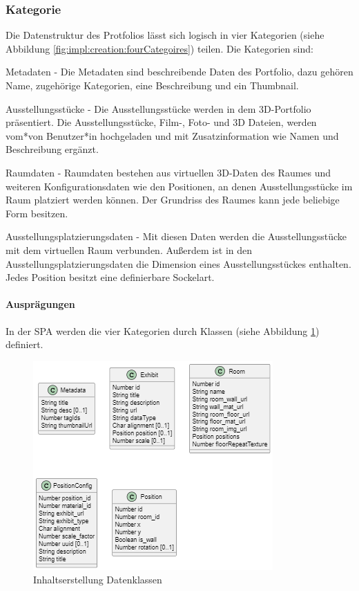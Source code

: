 \subsubsection{Kategorie}
Die Datenstruktur des Protfolios lässt sich logisch in vier Kategorien (siehe Abbildung \ref{fig:impl:creation:fourCategoires}) teilen. 
Die Kategorien sind:
\begin{compactitem}
\item Metadaten - Die Metadaten sind beschreibende Daten des Portfolio, dazu gehören Name, zugehörige Kategorien, eine Beschreibung und ein Thumbnail.
\item Ausstellungsstücke - Die Ausstellungsstücke werden in dem 3D-Portfolio präsentiert. Die Ausstellungsstücke, Film-, Foto- und 3D Dateien,  werden vom*von Benutzer*in hochgeladen und mit Zusatzinformation wie Namen und Beschreibung ergänzt. 
\item Raumdaten - Raumdaten bestehen aus virtuellen 3D-Daten des Raumes und weiteren Konfigurationsdaten wie den Positionen, an denen Ausstellungsstücke im Raum platziert werden können. Der Grundriss des Raumes kann jede beliebige Form besitzen. 
\item Ausstellungsplatzierungsdaten - Mit diesen Daten werden die Ausstellungsstücke mit dem virtuellen Raum verbunden. Außerdem ist in den Ausstellungsplatzierungsdaten die Dimension eines Ausstellungsstückes enthalten. Jedes Position besitzt eine definierbare Sockelart. 
\end{compactitem}

\paragraph{Ausprägungen}
In der SPA werden die vier Kategorien durch Klassen (siehe Abbildung \ref{fig:impl:creation:dataclasses}) definiert. 

\begin{figure}[ht]
    \centering
    \includegraphics[scale=0.9]{pics/content_creation_classes.png}
    \caption{Inhaltserstellung Datenklassen}
    \label{fig:impl:creation:dataclasses}
\end{figure}

